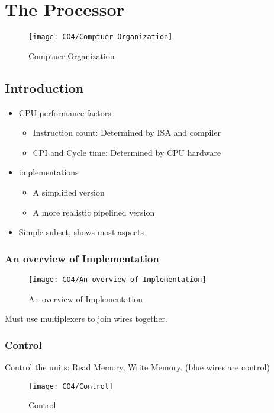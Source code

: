 \newpage
\section{The Processor}
\begin{figure}[!htb]
    \centering
    \texttt{[image: CO4/Comptuer Organization]}
    \caption{Comptuer Organization}
\end{figure}

\subsection{Introduction}
\begin{itemize}
    \item CPU performance factors
    \begin{itemize}
        \item\small Instruction count: Determined by ISA and compiler
        \item\small CPI and Cycle time: Determined by CPU hardware
    \end{itemize}
    \item implementations
    \begin{itemize}
        \item\small A simplified version
        \item\small A more realistic pipelined version
    \end{itemize}
    \item Simple subset, shows most aspects
\end{itemize}

\subsubsection{An overview of Implementation}

\begin{figure}[!htb]
    \centering
    \texttt{[image: CO4/An overview of Implementation]}
    \caption{An overview of Implementation}
\end{figure}

Must use multiplexers to join wires together. 

\subsubsection{Control}
Control the units: Read Memory, Write Memory. (blue wires are control)

\begin{figure}[!htb]
    \centering
    \texttt{[image: CO4/Control]}
    \caption{Control}
\end{figure}

